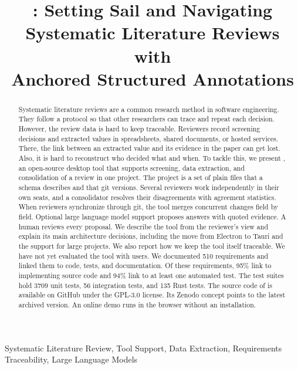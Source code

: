 \documentclass[conference]{IEEEtran}
\title{\SaiLoR: Setting Sail and Navigating\\Systematic Literature Reviews with\\Anchored Structured Annotations}
\author{\IEEEauthorblockN{Jan Keim}
\IEEEauthorblockA{Karlsruhe Institute of Technology (KIT)\\Karlsruhe, Germany\\jan.keim@kit.edu}}
\begin{document}
\maketitle

\begin{abstract}
Systematic literature reviews are a common research method in software engineering.
They follow a protocol so that other researchers can trace and repeat each decision.
However, the review data is hard to keep traceable.
Reviewers record screening decisions and extracted values in spreadsheets, shared documents, or hosted services.
There, the link between an extracted value and its evidence in the paper can get lost.
Also, it is hard to reconstruct who decided what and when.
To tackle this, we present \SaiLoR, an open-source desktop tool that supports screening, data extraction, and consolidation of a review in one project.
The project is a set of plain \JSON files that a schema describes and that git versions.
Several reviewers work independently in their own seats, and a consolidator resolves their disagreements with agreement statistics.
When reviewers synchronize through git, the tool merges concurrent changes field by field.
Optional large language model support proposes answers with quoted evidence. A human reviews every proposal.
We describe the tool from the reviewer's view and explain its main architecture decisions, including the move from Electron to Tauri and the support for large projects.
We also report how we keep the tool itself traceable.
We have not yet evaluated the tool with users.
We documented 510 requirements and linked them to code, tests, and documentation.
Of these requirements, 95\% link to implementing source code and 94\% link to at least one automated test.
The test suites hold 3709 unit tests, 56 integration tests, and 135 Rust tests.
The source code of \SaiLoR is available on GitHub under the GPL-3.0 license. Its Zenodo concept \DOI points to the latest archived version.
An online demo runs \SaiLoR in the browser without an installation.
\end{abstract}

\begin{IEEEkeywords}
Systematic Literature Review, Tool Support, Data Extraction, Requirements Traceability, Large Language Models
\end{IEEEkeywords}












\end{document}
